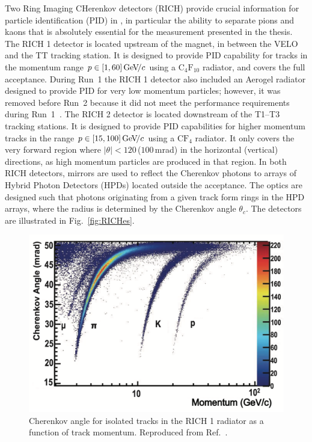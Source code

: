Two Ring Imaging CHerenkov detectors (RICH) provide crucial information for particle identification (PID) in \lhcb, in particular the ability to separate pions and kaons that is absolutely essential for the measurement presented in the thesis. The RICH 1 detector is located upstream of the magnet, in between the VELO and the TT tracking station. It is designed to provide PID capability for tracks in the momentum range $p\in[1, 60]\text{\,Ge\kern -0.1em V\!/}c$ using a $\mathrm{C_4F_{10}}$ radiator, and covers the full \lhcb acceptance. During Run~1 the RICH 1 detector also included an Aerogel radiator designed to provide PID for very low momentum particles; however, it was removed before Run~2 because it did not meet the performance requirements during Run~1~\cite{RICH-Performance,RICH-Performance-2}. The RICH 2 detector is located downstream of the T1--T3 tracking stations. It is designed to provide PID capabilities for higher momentum tracks in the range $p\in[15, 100]\text{\,Ge\kern -0.1em V\!/}c$ using a $\mathrm{CF_4}$ radiator. It only covers the very forward region where $|\theta| < 120$\,\mrad\;($100$\,mrad) in the horizontal (vertical) directions, as high momentum particles are produced in that region. In both RICH detectors, mirrors are used to reflect the Cherenkov photons to arrays of Hybrid Photon Detectors (HPDs) located outside the \lhcb acceptance. The optics are designed such that photons originating from a given track form rings in the HPD arrays, where the radius is determined by the Cherenkov angle $\theta_c$. The detectors are illustrated in Fig.~\ref{fig:RICHes}.

\begin{figure}[tb]
    \centering
    \includegraphics[width=0.55\columnwidth]{figures/detector/RICH_single_track.png}
    \caption{Cherenkov angle for isolated tracks in the RICH 1 radiator as a function of track momentum. Reproduced from Ref.~\cite{RICH-Performance}.}
    \label{fig:RICH_tracks}
\end{figure}

